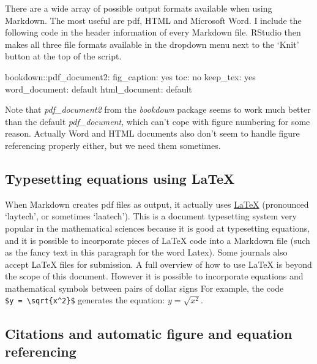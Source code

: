 \documentclass[
]{article}
\newenvironment{Shaded}{\begin{snugshade}}{\end{snugshade}}
\newcommand{\NormalTok}[1]{#1}
\newcommand{\SpecialCharTok}[1]{\textcolor[rgb]{0.00,0.00,0.00}{#1}}
\begin{document}
There are a wide array of possible output formats available when using Markdown. The most useful are pdf, HTML and Microsoft Word. I include the following code in the header information of every Markdown file. RStudio then makes all three file formats available in the dropdown menu next to the `Knit' button at the top of the script.

\begin{Shaded}
\begin{Highlighting}[]
\NormalTok{bookdown}\SpecialCharTok{::}\NormalTok{pdf\_document2}\SpecialCharTok{:}
\NormalTok{  fig\_caption}\SpecialCharTok{:}\NormalTok{ yes}
\NormalTok{  toc}\SpecialCharTok{:}\NormalTok{ no}
\NormalTok{  keep\_tex}\SpecialCharTok{:}\NormalTok{ yes}
\NormalTok{word\_document}\SpecialCharTok{:}\NormalTok{ default}
\NormalTok{html\_document}\SpecialCharTok{:}\NormalTok{ default}
\end{Highlighting}
\end{Shaded}

Note that \emph{pdf\_document2} from the \emph{bookdown} package seems to work much better than the default \emph{pdf\_document}, which can't cope with figure numbering for some reason. Actually Word and HTML documents also don't seem to handle figure referencing properly either, but we need them sometimes.

\hypertarget{typesetting-equations-using-latex}{%
\subsection{Typesetting equations using LaTeX}\label{typesetting-equations-using-latex}}

When Markdown creates pdf files as output, it actually uses \href{https://www.latex-project.org/}{\LaTeX{}} (pronounced `laytech', or sometimes `laatech'). This is a document typesetting system very popular in the mathematical sciences because it is good at typesetting equations, and it is possible to incorporate pieces of \LaTeX{} code into a Markdown file (such as the fancy text in this paragraph for the word Latex). Some journals also accept \LaTeX{} files for submission. A full overview of how to use LaTeX is beyond the scope of this document. However it is possible to incorporate equations and mathematical symbols between pairs of dollar signs For example, the code \texttt{\$y\ =\ \textbackslash{}sqrt\{x\^{}2\}\$} generates the equation: \(y = \sqrt{x^2}\).

\hypertarget{citations-and-automatic-figure-and-equation-referencing}{%
\subsection{Citations and automatic figure and equation referencing}\label{citations-and-automatic-figure-and-equation-referencing}}
\end{document}
